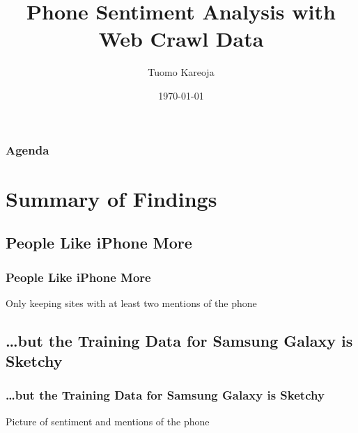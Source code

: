 \documentclass[10pt]{beamer}
\title[What Phone do People Like?]{Phone Sentiment Analysis with Web Crawl Data} %
\author{Tuomo Kareoja} %
\institute[Alert! Analytics] %
{
Alert! Analytics \\ %
\medskip
}
\date{\today} %
\begin{document}
\begin{frame}
\titlepage %
\end{frame}

\begin{frame}
\frametitle{Agenda} %
\tableofcontents %
\end{frame}


\section{Summary of Findings}

\subsection{People Like iPhone More}

\begin{frame}
\frametitle{People Like iPhone More}

Only keeping sites with at least two mentions of the phone




\end{frame}

\subsection{\ldots but the Training Data for Samsung Galaxy is Sketchy}

\begin{frame}
\frametitle{\ldots but the Training Data for Samsung Galaxy is Sketchy}

Picture of sentiment and mentions of the phone

\end{frame}
\end{document}
